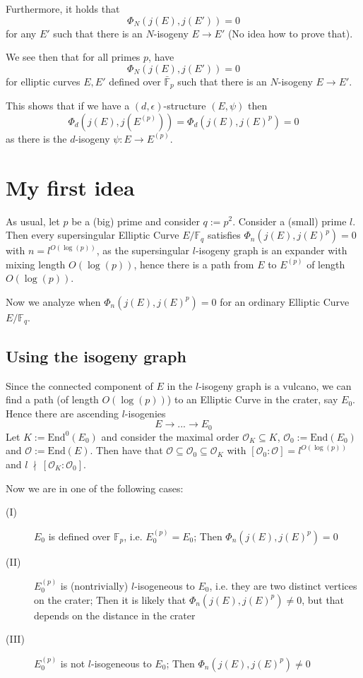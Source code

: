\documentclass{scrartcl}
\newcommand{\F}{\mathbb{F}}
\newcommand{\End}{\mathrm{End}}
\newcommand{\notdivides}{\ \nmid \ }
\renewcommand{\O}{\mathcal{O}}
\theoremstyle{definition}
\begin{document}
Furthermore, it holds that
\begin{equation*}
    \Phi_N(j(E), j(E')) = 0
\end{equation*}
for any $E'$ such that there is an $N$-isogeny $E \to E'$ (No idea how to prove that).

We see then that for all primes $p$, have
\begin{equation*}
    \Phi_N(j(E), j(E')) = 0
\end{equation*}
for elliptic curves $E, E'$ defined over $\bar{\F}_p$ such that there is an $N$-isogeny $E \to E'$.

This shows that if we have a $(d, \epsilon)$-structure $(E, \psi)$ then
\begin{equation*}
    \Phi_d(j(E), j(E^{(p)})) = \Phi_d(j(E), j(E)^p) = 0
\end{equation*}
as there is the $d$-isogeny $\psi: E \to E^{(p)}$.

\section{My first idea}
As usual, let $p$ be a (big) prime and consider $q := p^2$.
Consider a (small) prime $l$.
Then every supersingular Elliptic Curve $E/\F_q$ satisfies $\Phi_n(j(E), j(E)^p) = 0$ with $n = l^{O(\log(p))}$, as the supersingular $l$-isogeny graph is an expander with mixing length $O(\log(p))$, hence there is a path from $E$ to $E^{(p)}$ of length $O(\log(p))$.

Now we analyze when $\Phi_n(j(E), j(E)^p) = 0$ for an ordinary Elliptic Curve $E/\F_q$.

\subsection*{Using the isogeny graph}
Since the connected component of $E$ in the $l$-isogeny graph is a vulcano, we can find a path (of length $O(\log(p))$) to an Elliptic Curve in the crater, say $E_0$.
Hence there are ascending $l$-isogenies
\begin{equation*}
    E \to ... \to E_0
\end{equation*}
Let $K := \End^0(E_0)$ and consider the maximal order $\O_K \subseteq K$, $\O_0 := \End(E_0)$ and $\O := \End(E)$.
Then have that $\O \subseteq \O_0 \subseteq \O_K$ with $[\O_0 : \O] = l^{O(\log(p))}$ and $l \notdivides [\O_K : \O_0]$.

Now we are in one of the following cases:
\begin{description}
    \item[(I)] $E_0$ is defined over $\F_p$, i.e. $E_0^{(p)} = E_0$; Then $\Phi_n(j(E), j(E)^p) = 0$
    \item[(II)] $E_0^{(p)}$ is (nontrivially) $l$-isogeneous to $E_0$, i.e. they are two distinct vertices on the crater; Then it is likely that $\Phi_n(j(E), j(E)^p) \neq 0$, but that depends on the distance in the crater
    \item[(III)] $E_0^{(p)}$ is not $l$-isogeneous to $E_0$; Then $\Phi_n(j(E), j(E)^p) \neq 0$ 
\end{description}
\end{document}
